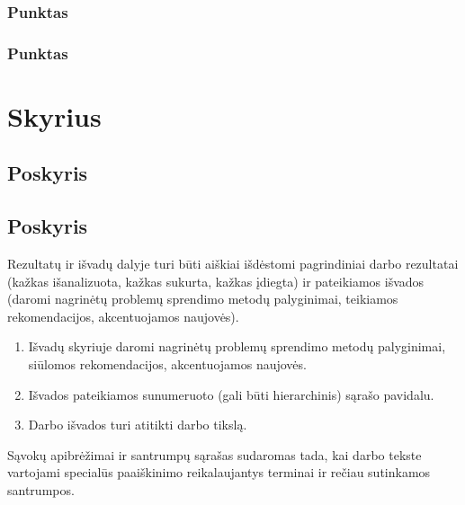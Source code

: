 \documentclass[
    english, %
]{VUMIFPSkursinis}
\begin{document}
\subsubsection{Punktas}
\subsubsection{Punktas}
\section{Skyrius}
\subsection{Poskyris}
\subsection{Poskyris}

Rezultatų ir išvadų dalyje turi būti aiškiai išdėstomi pagrindiniai darbo
rezultatai (kažkas išanalizuota, kažkas sukurta, kažkas įdiegta) ir pateikiamos
išvados (daromi nagrinėtų problemų sprendimo metodų palyginimai, teikiamos
rekomendacijos, akcentuojamos naujovės).

\begin{enumerate}[labelindent=0pt]
    \item Išvadų skyriuje daromi nagrinėtų problemų sprendimo metodų palyginimai, siūlomos
rekomendacijos, akcentuojamos naujovės.
    \item Išvados pateikiamos sunumeruoto (gali būti hierarchinis) sąrašo pavidalu.
    \item Darbo išvados turi atitikti darbo tikslą.
\end{enumerate}

\printbibliography[heading=bibintoc]  %

Sąvokų apibrėžimai ir santrumpų sąrašas sudaromas tada, kai darbo tekste
vartojami specialūs paaiškinimo reikalaujantys terminai ir rečiau sutinkamos
santrumpos.
\end{document}
